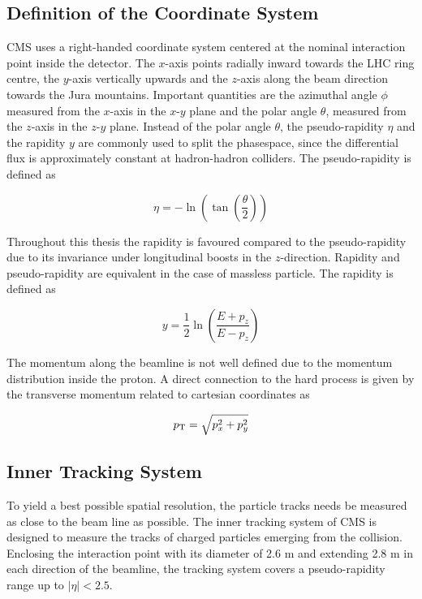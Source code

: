 
\subsection{Definition of the Coordinate System}

CMS uses a right-handed coordinate system centered at the nominal interaction point inside the
detector. The $x$-axis points radially inward towards the LHC ring centre, the
$y$-axis vertically upwards and the $z$-axis along the beam direction towards
the Jura mountains. Important quantities are the azimuthal angle $\phi$
measured from the $x$-axis in the $x$-$y$ plane and the polar angle $\theta$,
measured from the $z$-axis in the $z$-$y$ plane. Instead of the polar angle
$\theta$, the pseudo-rapidity $\eta$ and the rapidity $y$ are commonly used to
split the phasespace, since the differential flux is approximately constant at
hadron-hadron colliders. The pseudo-rapidity is defined as

\begin{equation}
    \eta = - \ln \left( \tan \left( \frac{\theta}{2} \right) \right)
\end{equation}

Throughout this thesis the rapidity is favoured compared to the pseudo-rapidity
due to its invariance under longitudinal boosts in the $z$-direction. Rapidity
and pseudo-rapidity are equivalent in the case of massless particle. The
rapidity is defined as

\begin{equation}
    y = \frac{1}{2} \ln \left( \frac{E + p_z}{E - p_z} \right) 
\end{equation}

The momentum along the beamline is not well defined due to the momentum
distribution inside the proton. A direct connection to the hard process is given
by the transverse momentum \pt related to cartesian coordinates as

\begin{equation}
    p_{\mathrm{T}} = \sqrt{p_x^2 + p_y^2}
\end{equation}

\subsection{Inner Tracking System}

To yield a best possible spatial resolution, the particle tracks needs be
measured as close to the beam line as possible. The inner tracking system of CMS
is designed to measure the tracks of charged particles emerging from the
collision. Enclosing the interaction point with its diameter of 2.6 m and
extending 2.8 m in each direction of the beamline, the tracking system covers a
pseudo-rapidity range up to $|\eta| < 2.5$. 

